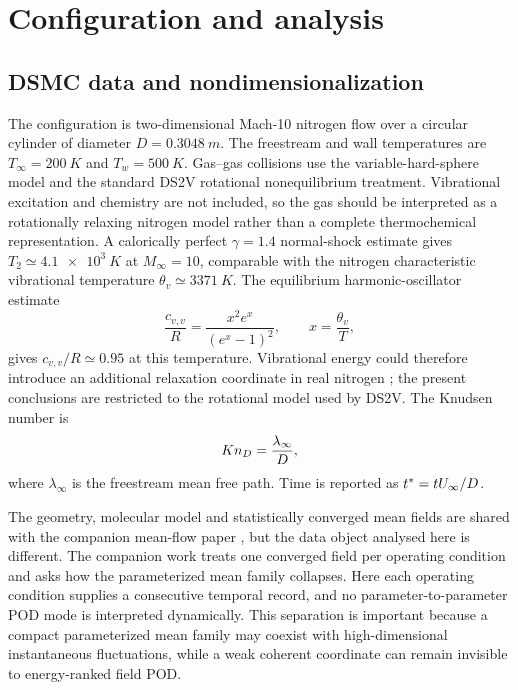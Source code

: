 \section{Configuration and analysis}
\subsection{DSMC data and nondimensionalization}
The configuration is two-dimensional Mach-10 nitrogen flow over a circular cylinder of diameter $D=\SI{0.3048}{m}$. The freestream and wall temperatures are $T_\infty=\SI{200}{K}$ and $T_w=\SI{500}{K}$. Gas--gas collisions use the variable-hard-sphere model and the standard DS2V rotational nonequilibrium treatment. Vibrational excitation and chemistry are not included, so the gas should be interpreted as a rotationally relaxing nitrogen model rather than a complete thermochemical representation. A calorically perfect $\gamma=1.4$ normal-shock estimate gives $T_2\simeq\SI{4.1e3}{K}$ at $M_\infty=10$, comparable with the nitrogen characteristic vibrational temperature $\theta_v\simeq\SI{3371}{K}$. The equilibrium harmonic-oscillator estimate
\begin{equation}
 \frac{c_{v,v}}{R}=\frac{x^2e^x}{(e^x-1)^2},\qquad x=\frac{\theta_v}{T},
\end{equation}
gives $c_{v,v}/R\simeq0.95$ at this temperature. Vibrational energy could therefore introduce an additional relaxation coordinate in real nitrogen \citep{MillikanWhite1963,Park1988,Hudson2022}; the present conclusions are restricted to the rotational model used by DS2V. The Knudsen number is
\begin{equation}
 Kn_D=\frac{\lambda_\infty}{D},
\end{equation}
where $\lambda_\infty$ is the freestream mean free path. Time is reported as $t^*=tU_\infty/D$.

The geometry, molecular model and statistically converged mean fields are shared with the companion mean-flow paper \citep{RoohiShoja2026Mean}, but the data object analysed here is different. The companion work treats one converged field per operating condition and asks how the parameterized mean family collapses. Here each operating condition supplies a consecutive temporal record, and no parameter-to-parameter POD mode is interpreted dynamically. This separation is important because a compact parameterized mean family may coexist with high-dimensional instantaneous fluctuations, while a weak coherent coordinate can remain invisible to energy-ranked field POD.

